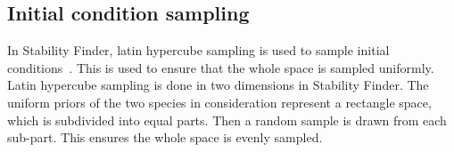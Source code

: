 %
%
%
%

\subsection{Initial condition sampling}
\label{sec:init_cond_samp}
In Stability Finder, latin hypercube sampling is used to sample initial conditions~\autocite{MCKAY:2000vt}. This is used to ensure that the whole space is sampled uniformly. Latin hypercube sampling is done in two dimensions in Stability Finder. The uniform priors of the two species in consideration represent a rectangle space, which is subdivided into equal parts. Then a random sample is drawn from each sub-part. This ensures the whole space is evenly sampled. 

